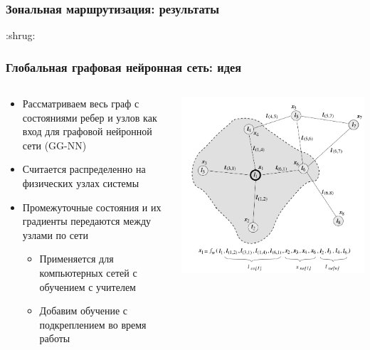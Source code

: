 \documentclass{beamer}
\begin{document}
\begin{frame}
  \frametitle{Зональная маршрутизация: результаты}
  \huge{:shrug:}
\end{frame}


\begin{frame}
  \frametitle{Глобальная графовая нейронная сеть: идея}
  \begin{columns}
    \begin{column}{0.6\textwidth}
      \begin{itemize}
      \item Рассматриваем весь граф с состояниями ребер и узлов как вход для
        графовой нейронной сети (GG-NN)
      \item Считается распределенно на физических узлах системы
      \item Промежуточные состояния и их градиенты передаются между узлами по
        сети 
        \begin{itemize}
        \item Применяется для компьютерных сетей с обучением с учителем\footnotemark
        \item Добавим обучение с подкреплением во время работы
        \end{itemize} 
      \end{itemize}
    \end{column}
    \begin{column}{0.4\textwidth}
      \begin{center}
        \includegraphics[width=\textwidth]{gnn.png}

\end{center}
\end{column}
\end{columns}
\end{frame}
\end{document}

